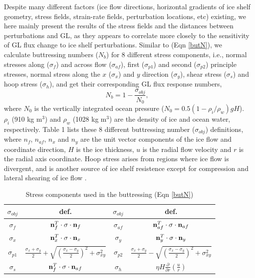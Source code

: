 \documentclass[review,oneside]{igs}
\begin{document}
Despite many different factors (ice flow directions, horizontal gradients of ice shelf geometry, stress fields, strain-rate fields, perturbation locations, etc) existing, we here mainly present the results of the stress fields and the distances between perturbations and GL, as they appears to correlate more closely to the sensitivity of GL flux change to ice shelf perturbations. Similar to  \cite{furst2016} (Eqn \ref{butN}), we calculate buttressing numbers ($N_b$) for 8 different stress components, i.e., normal stresses along ($\sigma_f$) and across flow ($\sigma_{af}$), first ($\sigma_{p1}$) and second ($\sigma_{p2}$) principle stresses, normal stress along the $x$ ($\sigma_{x}$) and $y$ direction ($\sigma_{y}$), shear stress ($\sigma_s$) and hoop stress ($\sigma_h$), and get their corresponding GL flux response numbers,
\begin{equation}
N_b=1-\frac{\sigma_{obj}}{N_0},
\label{butN}
\end{equation}
where $N_0$ is the vertically integrated ocean pressure ($N_0=0.5\left(1-{\rho_i}/{\rho_w}\right)gH$). $\rho_i$ (910 kg m$^3$) and $\rho_w$ (1028 kg m$^3$) are the density of ice and ocean water, respectively. Table 1 lists these 8 different buttressing number ($\sigma_{obj}$) definitions, where $n_f$, $n_{af}$, $n_x$ and $n_y$ are the unit vector components of the ice flow and coordinate direction, $H$ is the ice thickness, $u$ is the radial flow velocity and $r$ is the radial axis coordinate. Hoop stress arises from regions where ice flow is divergent, and is another source of ice shelf resistence except for compression and lateral shearing of ice flow \citep{pegler2012, wearing2016}.

\begin{table}
\centering
\caption{Stress components used in the buttressing (Eqn \ref{butN})}
\label{stressDef}
\begin{tabular}{|c|c|c|c|}
\hline
$\sigma_{obj}$ & def. & $\sigma_{obj}$ & def. \\
\hline
$\sigma_f$ & ${\bf{n}}^T_f\cdot{\bf{\sigma}}\cdot{\bf{n}}_f$ & $\sigma_{af}$ & ${\bf{n}}^T_{af}\cdot{\bf{\sigma}}\cdot{\bf{n}}_{af}$ \\ 
\hline 
$\sigma_{x}$ & ${\bf{n}}^T_x\cdot{\bf{\sigma}}\cdot{\bf{n}}_x$ & $\sigma_{y}$ & ${\bf{n}}^T_y\cdot{\bf{\sigma}}\cdot{\bf{n}}_y$ \\ 
\hline
$\sigma_{p1}$ & $\frac{\sigma_{x}+\sigma_{y}}{2}+\sqrt{\left(\frac{\sigma_{x}-\sigma_{y}}{2}\right)^2+\sigma_{xy}^2}$ & $\sigma_{p2}$ & $\frac{\sigma_{x}+\sigma_{y}}{2}-\sqrt{\left(\frac{\sigma_{x}-\sigma_{y}}{2}\right)^2+\sigma_{xy}^2}$ \\ 
\hline 
$\sigma_s$ & ${\bf{n}}^T_f\cdot{\bf{\sigma}}\cdot{\bf{n}}_{af}$ & $\sigma_h$ & $\eta H\frac{\partial}{\partial r}\left(\frac{u}{r}\right)$ \\ 
\hline

\end{tabular}
\end{table}
\end{document}
